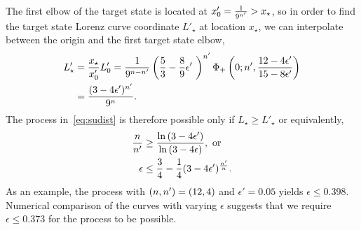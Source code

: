 \documentclass[pra,
aps,
twocolumn,
superscriptaddress,
groupedaddress,
nofootinbib,
reprint
]{revtex4-1}
\begin{document}
The first elbow of the target state is located at $x'_0 = \frac{1}{9^{\tt}} > x_\star$, so in order to find the target state Lorenz curve coordinate $L'_\star$ at location $x_\star$, we can interpolate between the origin and the first target state elbow, 
\begin{equation}\label{eq:constraint_deriv}
	\begin{split}
	L'_\star &= \frac{x_\star}{x'_0}L'_0 = \frac{1}{9^{\nn-\tt}}\left( \frac{5}{3} - \frac{8}{9}\epsilon'\ \right)^{\tt}\Phi_+\left(0;\tt,\frac{12-4\epsilon'}{15-8\epsilon'}\right) \\
	&= \frac{(3-4\epsilon')^{\tt}}{9^{\nn}}.
	\end{split}
\end{equation}
The process in~\cref{eq:sudist} is therefore possible only if $L_\star \geq L'_\star$ or equivalently,
\begin{align}
	\frac{n}{n'} &\geq \frac{\ln{(3-4\epsilon')}}{\ln{(3-4\epsilon)}}, \text{ or}\\
	\epsilon &\leq \frac{3}{4} - \frac{1}{4}(3-4\epsilon')^{\frac{\tt}{\nn}}.
\end{align}
As an example, the process with $(\nn, \tt) = (12, 4)$ and $\epsilon' = 0.05$ yields $\epsilon \leq 0.398$.
Numerical comparison of the curves with varying $\epsilon$ suggests that we require $\epsilon \leq 0.373$ for the process to be possible.
\end{document}
